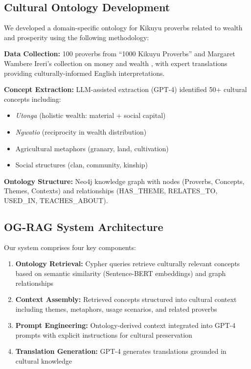 \documentclass[11pt,twocolumn]{article}
\begin{document}
\subsection{Cultural Ontology Development}

We developed a domain-specific ontology for Kikuyu proverbs related to wealth and prosperity using the following methodology:

\textbf{Data Collection:} 100 proverbs from ``1000 Kikuyu Proverbs'' and Margaret Wambere Ireri's collection on money and wealth \cite{ireri2019proverbs}, with expert translations providing culturally-informed English interpretations.

\textbf{Concept Extraction:} LLM-assisted extraction (GPT-4) identified 50+ cultural concepts including:
\begin{itemize}
    \item \textit{Utonga} (holistic wealth: material + social capital)
    \item \textit{Ngwatio} (reciprocity in wealth distribution)
    \item Agricultural metaphors (granary, land, cultivation)
    \item Social structures (clan, community, kinship)
\end{itemize}

\textbf{Ontology Structure:} Neo4j knowledge graph with nodes (Proverbs, Concepts, Themes, Contexts) and relationships (HAS\_THEME, RELATES\_TO, USED\_IN, TEACHES\_ABOUT).

\subsection{OG-RAG System Architecture}

Our system comprises four key components:

\begin{enumerate}
    \item \textbf{Ontology Retrieval:} Cypher queries retrieve culturally relevant concepts based on semantic similarity (Sentence-BERT embeddings) and graph relationships
    \item \textbf{Context Assembly:} Retrieved concepts structured into cultural context including themes, metaphors, usage scenarios, and related proverbs
    \item \textbf{Prompt Engineering:} Ontology-derived context integrated into GPT-4 prompts with explicit instructions for cultural preservation
    \item \textbf{Translation Generation:} GPT-4 generates translations grounded in cultural knowledge
\end{enumerate}
\end{document}
